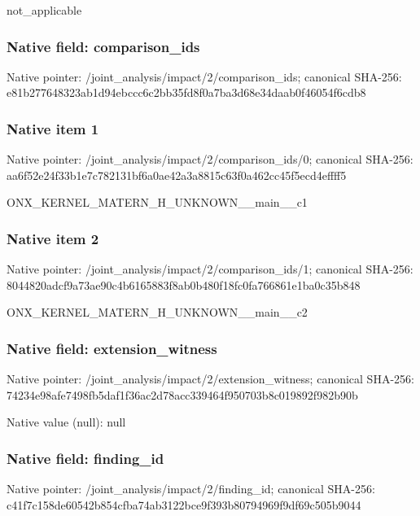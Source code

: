 \documentclass[10pt,a4paper]{article}
\begin{document}
\begingroup\raggedright\sloppy not\_\allowbreak{}applicable\par\endgroup

\subsubsection{Native field: comparison\_\allowbreak{}ids}
Native pointer: /joint\_\allowbreak{}analysis/impact/2/comparison\_\allowbreak{}ids; canonical SHA-256: e81b277648323ab1d94ebccc6c2bb35fd8f0a7ba3d68e34daab0f46054f6cdb8

\subsubsection{Native item 1}
Native pointer: /joint\_\allowbreak{}analysis/impact/2/comparison\_\allowbreak{}ids/0; canonical SHA-256: aa6f52e24f33b1e7c782131bf6a0ae42a3a8815c63f0a462cc45f5ecd4effff5

\begingroup\raggedright\sloppy ONX\_\allowbreak{}KERNEL\_\allowbreak{}MATERN\_\allowbreak{}H\_\allowbreak{}UNKNOWN\_\allowbreak{}\_\allowbreak{}main\_\allowbreak{}\_\allowbreak{}c1\par\endgroup

\subsubsection{Native item 2}
Native pointer: /joint\_\allowbreak{}analysis/impact/2/comparison\_\allowbreak{}ids/1; canonical SHA-256: 8044820adcf9a73ae90c4b6165883f8ab0b480f18fc0fa766861e1ba0c35b848

\begingroup\raggedright\sloppy ONX\_\allowbreak{}KERNEL\_\allowbreak{}MATERN\_\allowbreak{}H\_\allowbreak{}UNKNOWN\_\allowbreak{}\_\allowbreak{}main\_\allowbreak{}\_\allowbreak{}c2\par\endgroup

\subsubsection{Native field: extension\_\allowbreak{}witness}
Native pointer: /joint\_\allowbreak{}analysis/impact/2/extension\_\allowbreak{}witness; canonical SHA-256: 74234e98afe7498fb5daf1f36ac2d78acc339464f950703b8c019892f982b90b

Native value (null): null

\subsubsection{Native field: finding\_\allowbreak{}id}
Native pointer: /joint\_\allowbreak{}analysis/impact/2/finding\_\allowbreak{}id; canonical SHA-256: c41f7c158de60542b854cfba74ab3122bce9f393b80794969f9df69c505b9044
\end{document}
